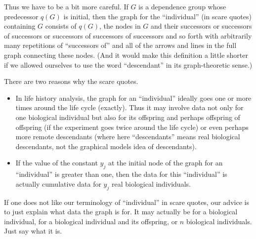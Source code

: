 Thus we have to be a bit more careful.  If $G$ is a dependence group whose
predecessor $q(G)$ is initial, then the graph for the ``individual''
(in scare quotes) containing $G$ consists of $q(G)$, the nodes in $G$
and their successors or successors of successors or successors of successors
of successors and so forth with arbitrarily many repetitions
of ``successors of'' and all of the arrows and lines in the full graph
connecting these nodes.  (And it would make this definition a little shorter
if we allowed ourselves to use the word ``descendant'' in its graph-theoretic
sense.)

There are two reasons why the scare quotes.
\begin{itemize}
\item In life history
analysis, the graph for an ``individual'' ideally goes one or more times
around the life cycle (exactly).  Thus it may involve data not only for
one biological individual but also for its offspring and perhaps offspring
of offspring (if the experiment goes twice around the life cycle) or even
perhaps more remote descendants (where here ``descendants'' means real
biological descendants, not the graphical models idea of descendants).
\item If the value of the constant $y_j$ at the initial node of the
graph for an ``individual'' is greater than one, then the data for this
``individual'' is actually cumulative data for $y_j$ real biological
individuals.
\end{itemize}


If one does not like our terminology of ``individual'' in scare quotes,
our advice is to just explain what data the graph is for.  It may actually
be for a biological individual, for a biological individual
and its offspring, or $n$ biological individuals.  Just say what it is.

